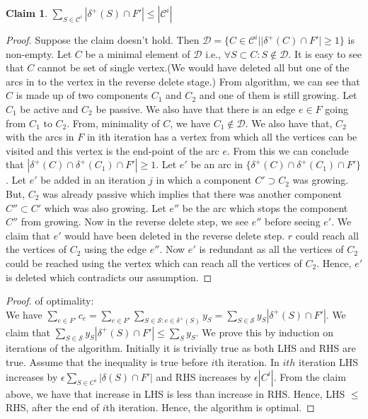 \documentclass{article}
\newtheorem{claim}{Claim}
\newcommand{\set}[1]{\{#1\}}
\begin{document}
\begin{claim}
    $\sum_{S \in \mathcal{C}^i}|\delta^+(S) \cap F'| \le |\mathcal{C}^i|$
\end{claim}
\begin{proof}
    Suppose the claim doesn't hold. Then $\mathcal{D} = \set{C \in \mathcal{C}^i | |\delta^+(C) \cap F'| \ge 1}$ is non-empty. Let $C$ be a minimal element of $\mathcal{D}$ i.e., $\forall S \subset C : S \notin \mathcal{D}$. It is easy to see that $C$ cannot be set of single vertex.(We would have deleted all but one of the arcs in to the vertex in the reverse delete stage.) From algorithm, we can see that $C$ is made up of two
    components $C_1$ and $C_2$ and one of them is still growing. Let $C_1$ be active and $C_2$ be passive. We also have that there is an edge $e \in F$ going from $C_1$ to $C_2$. From, minimality of $C$, we have $C_1 \notin \mathcal{D}$. We also have that, $C_2$ with the arcs in $F$ in ith iteration has a vertex from which all the vertices can be visited and this vertex is the end-point of the arc $e$. From this we can conclude that $|\delta^+(C) \cap \delta^+(C_1) \cap F'| \ge 1$. Let $e'$ be an arc in $\set{\delta^+(C) \cap \delta^+(C_1) \cap F'}$. Let $e'$ be added in an iteration $j$ in which a
    component $C' \supset C_2$ was growing. But, $C_2$ was already passive which implies that there was another component $C'' \subset C'$ which was also growing. Let $e''$ be the arc which stops the component $C''$ from growing. Now in the reverse delete step, we see $e''$ before seeing $e'$. We claim that $e'$ would have been deleted in the reverse delete step. $r$ could reach all the vertices of $C_2$ using the edge $e''$. Now $e'$ is redundant as all the vertices of $C_2$ could be reached using the vertex which can reach all the vertices of $C_2$. Hence, $e'$ is deleted which contradicts our assumption.
\end{proof}
\begin{proof} of optimality:\\
We have $\sum_{e \in F'}c_e = \sum_{e \in F'}\sum_{S \in \mathcal{S}: e \in \delta^+(S)}y_S = \sum_{S \in \mathcal{S}}y_S|\delta^+(S) \cap F'|$. We claim that $\sum_{S \in \mathcal{S}}y_S|\delta^+(S) \cap F'| \le \sum_{S}y_S$. We prove this by induction on iterations of the algorithm. Initially it is trivially true as both LHS and RHS are true. Assume that the inequality is true before $i$th iteration. In $ith$ iteration LHS increases by $\epsilon\sum_{S \in C^i}|\delta(S) \cap F'|$ and RHS increases by $\epsilon|C^i|$. From the claim above, we have that increase in LHS is less than increase in RHS. Hence, LHS $\le$ RHS, after the end of $i$th iteration. Hence, the algorithm is optimal.
\end{proof}
\end{document}
